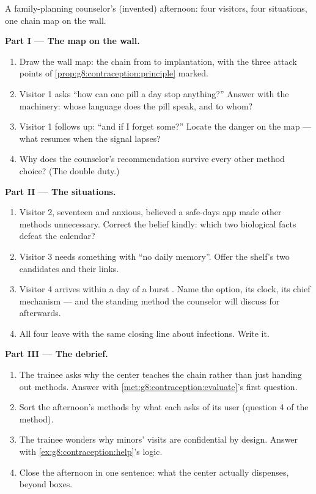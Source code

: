 \begin{problem}\label{pb:g8:contraception:1}
A family-planning counselor's (invented) afternoon:
four visitors, four situations, one chain map on the
wall.

\medskip\noindent\textbf{Part I --- The map on the
wall.}
\begin{enumerate}
  \item Draw the wall map: the chain from  to
        implantation, with the three attack points of
        \cref{prop:g8:contraception:principle} marked.
  \item Visitor 1 asks ``how can one pill a day stop
        anything?'' Answer with the machinery: whose
        language does the pill speak, and to whom?
  \item Visitor 1 follows up: ``and if I forget
        some?'' Locate the danger on the map --- what
        resumes when the  signal lapses?
  \item Why does the counselor's 
        recommendation survive every other method
        choice? (The double duty.)
\end{enumerate}

\medskip\noindent\textbf{Part II --- The situations.}
\begin{enumerate}[resume]
  \item Visitor 2, seventeen and anxious, believed a
        safe-days app made other methods unnecessary.
        Correct the belief kindly:
        which two biological facts defeat the
        calendar?
  \item Visitor 3 needs something with ``no daily
        memory''. Offer the shelf's two candidates and
        their links.
  \item Visitor 4 arrives within a day of a burst
        . Name the option, its clock, its chief
        mechanism --- and the standing method the
        counselor will discuss for afterwards.
  \item All four leave with the same closing line
        about infections. Write it.
\end{enumerate}

\medskip\noindent\textbf{Part III --- The debrief.}
\begin{enumerate}[resume]
  \item The trainee asks why the center teaches the
        chain rather than just handing out methods.
        Answer with
        \cref{met:g8:contraception:evaluate}'s first
        question.
  \item Sort the afternoon's methods by what each asks
        of its user (question 4 of the method).
  \item The trainee wonders why minors' visits are
        confidential by design. Answer with
        \cref{ex:g8:contraception:help}'s logic.
  \item Close the afternoon in one sentence: what the
        center actually dispenses, beyond boxes.
\end{enumerate}
\end{problem}
